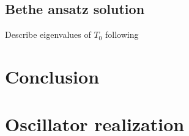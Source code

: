 \documentclass[11pt]{article}
\numberwithin{equation}{section}
\numberwithin{equation}{subsection}
\begin{document}

\subsection{Bethe ansatz solution}

Describe eigenvalues of $T_0$ following 
\cite{Belliard2} 





\section{Conclusion}








\appendix
\section{Oscillator realization}\label{appA}
\end{document}
